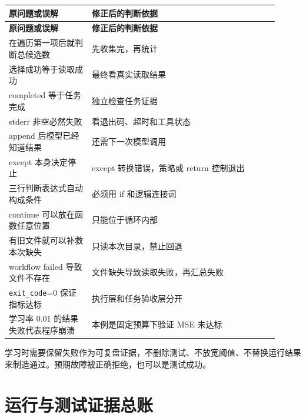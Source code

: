{\small\setlength{\tabcolsep}{4pt}
\renewcommand{\arraystretch}{1.25}
\begin{longtable}{>{\raggedright\arraybackslash}p{0.28\linewidth}>{\raggedright\arraybackslash}p{0.63\linewidth}}
\toprule
\textbf{原问题或误解} & \textbf{修正后的判断依据} \\
\midrule\endfirsthead
\toprule
\textbf{原问题或误解} & \textbf{修正后的判断依据} \\
\midrule\endhead
\bottomrule\endfoot
在遍历第一项后就判断总候选数 & 先收集完，再统计 \\
选择成功等于读取成功 & 最终看真实读取结果 \\
completed 等于任务完成 & 独立检查任务证据 \\
stderr 非空必然失败 & 看退出码、超时和工具状态 \\
append 后模型已经知道结果 & 还需下一次模型调用 \\
except 本身决定停止 & except 转换错误，策略或 return 控制退出 \\
三行判断表达式自动构成条件 & 必须用 if 和逻辑连接词 \\
continue 可以放在函数任意位置 & 只能位于循环内部 \\
有旧文件就可以补救本次缺失 & 只读本次目录，禁止回退 \\
workflow failed 导致文件不存在 & 文件缺失导致读取失败，再汇总失败 \\
\nolinkurl{exit_code}=0 保证指标达标 & 执行层和任务验收层分开 \\
学习率 0.01 的结果失败代表程序崩溃 & 本例是固定预算下验证 MSE 未达标 \\
\end{longtable}}

学习时需要保留失败作为可复盘证据，不删除测试、不放宽阈值、不替换运行结果来制造通过。预期故障被正确拒绝，也可以是测试成功。

\section{运行与测试证据总账}

